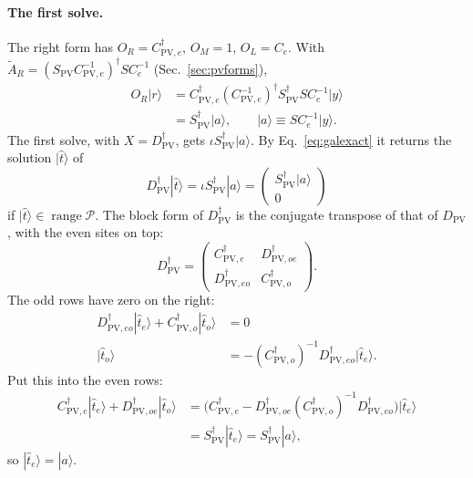 \documentclass[11pt,a4paper]{article}
\numberwithin{equation}{section}
\newcommand{\dg}{^{\dagger}}
\newcommand{\Dpv}{D_{\mathrm{PV}}}
\newcommand{\Spv}{S_{\mathrm{PV}}}
\newcommand{\AR}{\tilde A_{R}}
\newcommand{\Pro}{\mathcal P}
\newcommand{\Ce}{C_{e}}
\newcommand{\Cpve}{C_{\mathrm{PV},e}}
\newcommand{\Cpvo}{C_{\mathrm{PV},o}}
\begin{document}
\paragraph{The first solve.} The right form has $O_R=\Cpve\dg$, $O_M=1$, $O_L=\Ce$. With
$\AR=(\Spv\Cpve^{-1})\dg S\Ce^{-1}$ (Sec.~\ref{sec:pvforms}),
\begin{align}
O_R|r\rangle&=\Cpve\dg(\Cpve^{-1})\dg\Spv\dg S\Ce^{-1}|y\rangle\nonumber\\
&=\Spv\dg|a\rangle,\qquad |a\rangle\equiv S\Ce^{-1}|y\rangle .
\end{align}
The first solve, with $X=\Dpv\dg$, gets $\iota\Spv\dg|a\rangle$. By Eq.~\eqref{eq:galexact} it
returns the solution $|\hat t\rangle$ of
\begin{equation}
\Dpv\dg|\hat t\rangle=\iota\Spv\dg|a\rangle=\begin{pmatrix}\Spv\dg|a\rangle\\0\end{pmatrix}
\end{equation}
if $|\hat t\rangle\in\operatorname{range}\Pro$. The block form of $\Dpv\dg$ is the conjugate
transpose of that of $\Dpv$, with the even sites on top:
\begin{equation}
\Dpv\dg=\begin{pmatrix}\Cpve\dg&D_{\mathrm{PV},oe}\dg\\D_{\mathrm{PV},eo}\dg&\Cpvo\dg\end{pmatrix}.
\end{equation}
The odd rows have zero on the right:
\begin{align}
D_{\mathrm{PV},eo}\dg|\hat t_e\rangle+\Cpvo\dg|\hat t_o\rangle&=0\nonumber\\
|\hat t_o\rangle&=-(\Cpvo\dg)^{-1}D_{\mathrm{PV},eo}\dg|\hat t_e\rangle .
\end{align}
Put this into the even rows:
\begin{align}
\Cpve\dg|\hat t_e\rangle+D_{\mathrm{PV},oe}\dg|\hat t_o\rangle
&=\big(\Cpve\dg-D_{\mathrm{PV},oe}\dg(\Cpvo\dg)^{-1}D_{\mathrm{PV},eo}\dg\big)|\hat t_e\rangle\nonumber\\
&=\Spv\dg|\hat t_e\rangle=\Spv\dg|a\rangle ,
\end{align}
so $|\hat t_e\rangle=|a\rangle$.
\end{document}
